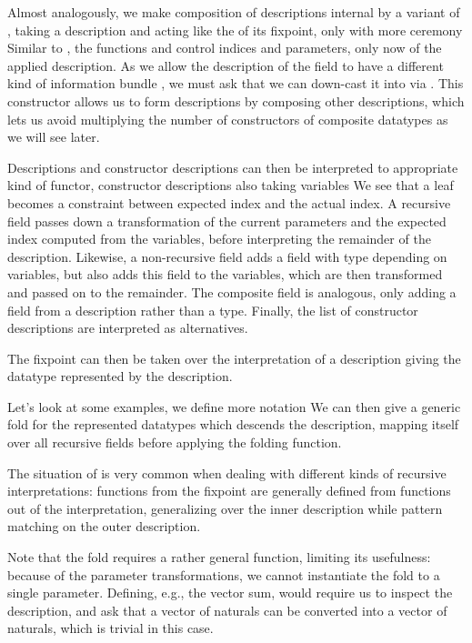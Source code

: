Almost analogously, we make composition of descriptions internal by a variant of , taking a description and acting like the  of its fixpoint, only with more ceremony
Similar to , the functions  and  control indices and parameters, only now of the applied description. As we allow the description  of the field to have a different kind of information bundle , we must ask that we can down-cast it into  via . This constructor allows us to form descriptions by composing other descriptions, which lets us avoid multiplying the number of constructors of composite datatypes as we will see later.

Descriptions and constructor descriptions can then be interpreted to appropriate kind of functor, constructor descriptions also taking variables
We see that a leaf becomes a constraint between expected index and the actual index. A recursive field passes down a transformation of the current parameters and the expected index computed from the variables, before interpreting the remainder of the description. Likewise, a non-recursive field adds a field with type depending on variables, but also adds this field to the variables, which are then transformed and passed on to the remainder. The composite field is analogous, only adding a field from a description rather than a type. Finally, the list of constructor descriptions are interpreted as alternatives.

The fixpoint can then be taken over the interpretation of a description
giving the datatype represented by the description.

Let's look at some examples, we define more notation
We can then give a generic fold for the represented datatypes
which descends the description, mapping itself over all recursive fields before applying the folding function.
\begin{remark}
    The situation of  is very common when dealing with different kinds of recursive interpretations: functions from the fixpoint are generally defined from functions out of the interpretation, generalizing over the inner description while pattern matching on the outer description. 
\end{remark}
Note that the fold requires a rather general function, limiting its usefulness: because of the parameter transformations, we cannot instantiate the fold to a single parameter. Defining, e.g., the vector sum, would require us to inspect the description, and ask that a vector of naturals can be converted into a vector of naturals, which is trivial in this case.


